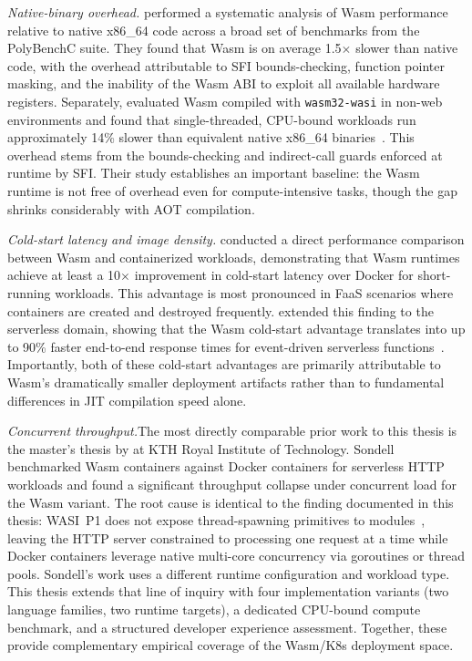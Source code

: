 \begin{sloppypar}
\textit{Native-binary overhead.}\quad \textcite{jangda2019notsofast} performed a systematic analysis of \acs{Wasm} performance relative to native x86\_64 code across a broad set of benchmarks from the PolyBenchC suite. They found that \acs{Wasm} is on average 1.5$\times$ slower than native code, with the overhead attributable to \acs{SFI} bounds-checking, function pointer masking, and the inability of the \acs{Wasm} \acs{ABI} to exploit all available hardware registers. Separately, \textcite{spies2021evaluation} evaluated \acs{Wasm} compiled with \texttt{wasm32-wasi} in non-web environments and found that single-threaded, \acs{CPU}-bound workloads run approximately 14\% slower than equivalent native x86\_64 binaries~\cite{spies2021evaluation}. This overhead stems from the bounds-checking and indirect-call guards enforced at runtime by \acs{SFI}. Their study establishes an important baseline: the \acs{Wasm} runtime is not free of overhead even for compute-intensive tasks, though the gap shrinks considerably with \ac{AOT} compilation.
\end{sloppypar}

\textit{Cold-start latency and image density.}\quad \textcite{long2023wasm} conducted a direct performance comparison between \acs{Wasm} and containerized workloads, demonstrating that \acs{Wasm} runtimes achieve at least a 10$\times$ improvement in cold-start latency over Docker for short-running workloads. This advantage is most pronounced in \acl{FaaS} scenarios where containers are created and destroyed frequently. \textcite{hall2021serverless} extended this finding to the serverless domain, showing that the \acs{Wasm} cold-start advantage translates into up to 90\% faster end-to-end response times for event-driven serverless functions~\cite{hall2021serverless}. Importantly, both of these cold-start advantages are primarily attributable to \acs{Wasm}'s dramatically smaller deployment artifacts rather than to fundamental differences in \ac{JIT} compilation speed alone.

\textit{Concurrent throughput.}\quad The most directly comparable prior work to this thesis is the master's thesis by \textcite{sondell2024performance} at \acs{KTH} Royal Institute of Technology. Sondell benchmarked \acs{Wasm} containers against Docker containers for serverless \acs{HTTP} workloads and found a significant throughput collapse under concurrent load for the \acs{Wasm} variant. The root cause is identical to the finding documented in this thesis: \acs{WASI}~P1 does not expose thread-spawning primitives to modules~\cite{clark2019standardizing}, leaving the \acs{HTTP} server constrained to processing one request at a time while Docker containers leverage native multi-core concurrency via goroutines or thread pools. Sondell's work uses a different runtime configuration and workload type. This thesis extends that line of inquiry with four implementation variants (two language families, two runtime targets), a dedicated \acs{CPU}-bound compute benchmark, and a structured developer experience assessment. Together, these provide complementary empirical coverage of the \acs{Wasm}/\acs{K8s} deployment space.

